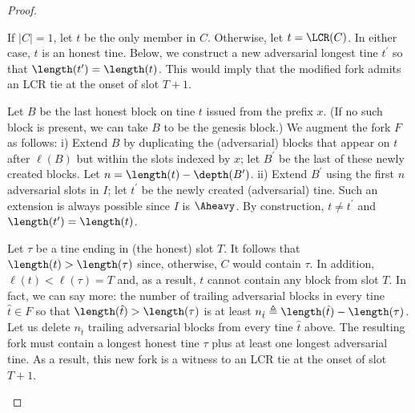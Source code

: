 \begin{proof}
\begin{description}[font=\normalfont\itshape\space]
\begin{description}[font=\normalfont\itshape\space]
            \item[If $C$ contains only honest tines:] 
            If $|C| = 1$, let $t$ be the only member in $C$.
            Otherwise, let $t = \LCR(C)$. 
            In either case, $t$ is an honest tine.
            Below, we construct a new adversarial longest tine $t^\prime$ 
            so that $\length(t^\prime) = \length(t)$. 
            This would imply that the modified fork admits 
            an LCR tie at the onset of slot $T + 1$.

            Let $B$ be the last honest block 
            on tine $t$ issued from the prefix $x$.
            (If no such block is present, we can take $B$ to be the genesis block.)
            We augment the fork $F$ as follows: 
            i) Extend $B$ by duplicating the (adversarial) blocks 
            that appear on $t$ after $\ell(B)$ but within the slots indexed by $x$; 
            let $B^\prime$ be the last of these newly created blocks. 
            Let $n = \length(t) - \depth(B^\prime)$.
            ii) Extend $B^\prime$ using the first $n$ adversarial slots in $I$;  
            let $t^\prime$ be the 
            newly created (adversarial) tine. 
            Such an extension is always possible since $I$ is $\Aheavy$.
            By construction, $t \neq t^\prime$ and $\length(t^\prime) = \length(t)$. 

            \item[If $C = \{t\}$ where $t$ is an adversarial tine.]
            Let $\tau$ be a tine ending in (the honest) slot $T$. 
            It follows that $\length(t) > \length(\tau)$ 
            since, otherwise, $C$ would contain $\tau$.
            In addition, $\ell(t) < \ell(\tau) = T$ and, as a result, 
            $t$ cannot contain any block from slot $T$. 
            In fact, we can say more: 
            the number of trailing adversarial blocks in 
            every tine $\hat{t} \in F$ so that $\length(\hat{t}) > \length(\tau)$ 
            is at least $n_{\hat{t}} \triangleq \length(\hat{t}) - \length(\tau)$.
            Let us delete $n_{\hat{t}}$ trailing adversarial blocks 
            from every tine $\hat{t}$ above. 
            The resulting fork must contain a longest honest tine $\tau$ 
            plus at least one longest adversarial tine. 
            As a result, this new fork is a witness to an LCR tie at the onset of slot $T + 1$.
          \end{description}

        \end{description}

      \end{proof}

